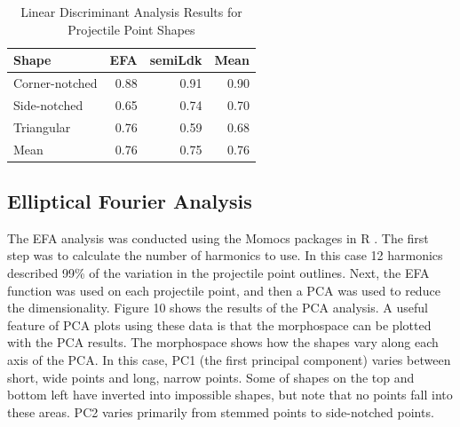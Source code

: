 \documentclass[a4paper]{article}
\begin{document}
\begin{table}

\caption{\label{tab:LDAResultsShape}Linear Discriminant Analysis Results for Projectile Point Shapes}
\centering
\begin{tabular}[t]{lrrr}
\toprule
Shape & EFA & semiLdk & Mean\\
\midrule
Corner-notched & 0.88 & 0.91 & 0.90\\
Side-notched & 0.65 & 0.74 & 0.70\\
Triangular & 0.76 & 0.59 & 0.68\\
Mean & 0.76 & 0.75 & 0.76\\
\bottomrule
\end{tabular}
\end{table}

\hypertarget{elliptical-fourier-analysis}{%
\subsection*{Elliptical Fourier Analysis}\label{elliptical-fourier-analysis}}

The EFA analysis was conducted using the Momocs packages \autocite{Bonhomme2014-gt} in R \autocite{R_Core_Team2022-wb}. The first step was to calculate the number of harmonics to use. In this case 12 harmonics described 99\% of the variation in the projectile point outlines. Next, the EFA function was used on each projectile point, and then a PCA was used to reduce the dimensionality. Figure 10 shows the results of the PCA analysis. A useful feature of PCA plots using these data is that the morphospace can be plotted with the PCA results. The morphospace shows how the shapes vary along each axis of the PCA. In this case, PC1 (the first principal component) varies between short, wide points and long, narrow points. Some of shapes on the top and bottom left have inverted into impossible shapes, but note that no points fall into these areas. PC2 varies primarily from stemmed points to side-notched points.
\end{document}
